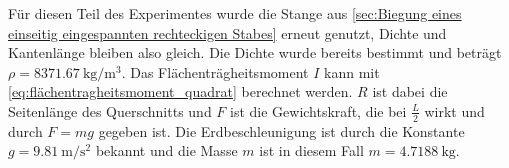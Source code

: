 \begin{table}
    \centering
    \caption{Messergebnisse zu dem beidseitig eingespannten rechteckigen Stab}
    \label{tab:beidseitig_eckig}
\end{table}

Für diesen Teil des Experimentes wurde die Stange aus \autoref{sec:Biegung eines einseitig eingespannten rechteckigen Stabes} erneut genutzt, Dichte und Kantenlänge bleiben also gleich. 
Die Dichte wurde bereits bestimmt und beträgt $\rho = \SI{8371.67}{\kilogram \per \cubic\meter}$.  
Das Flächenträgheitsmoment $I$ kann mit \autoref{eq:flächentragheitsmoment_quadrat} berechnet werden. 
$R$ ist dabei die Seitenlänge des Querschnitts und $F$ ist die Gewichtskraft, die bei $\frac{L}{2}$ wirkt und durch $F=mg$ gegeben ist. 
Die Erdbeschleunigung ist durch die Konstante $g=\SI{9.81}{\meter\per\second\squared}$ bekannt und die Masse $m$ ist in diesem Fall $m = \SI{4.7188}{\kilogram}$.\cite{physics_constants}
  
